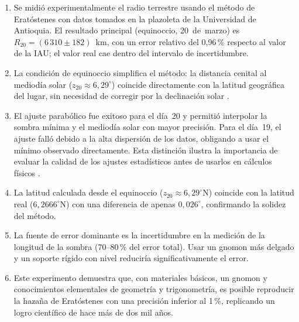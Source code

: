 \begin{enumerate}
  \item Se midió experimentalmente el radio terrestre usando el método
        de Eratóstenes con datos tomados en la plazoleta de la
        Universidad de Antioquia.
        El resultado principal (equinoccio, 20~de~marzo) es
        $R_{20} = (6\,310 \pm 182)$~km, con un error relativo del
        0{,}96\,\% respecto al valor de la IAU; el valor real cae
        dentro del intervalo de incertidumbre.

  \item La condición de equinoccio simplifica el método: la distancia
        cenital al mediodía solar ($z_{20} \approx 6{,}29^\circ$) coincide
        directamente con la latitud geográfica del lugar, sin necesidad
        de corregir por la declinación solar \citep{PortillaBarbosa2009}.

  \item El ajuste parabólico fue exitoso para el día~20 y permitió
        interpolar la sombra mínima y el mediodía solar con mayor
        precisión.
        Para el día~19, el ajuste falló debido a la alta dispersión de
        los datos, obligando a usar el mínimo observado directamente.
        Esta distinción ilustra la importancia de evaluar la calidad
        de los ajustes estadísticos antes de usarlos en cálculos físicos
        \citep{Baird1991}.

  \item La latitud calculada desde el equinoccio
        ($z_{20} \approx 6{,}29^\circ$N) coincide con la latitud real
        ($6{,}2666^\circ$N) con una diferencia de apenas $0{,}026^\circ$,
        confirmando la solidez del método.

  \item La fuente de error dominante es la incertidumbre en la
        medición de la longitud de la sombra (70--80\,\% del
        error total).
        Usar un gnomon más delgado y un soporte rígido con nivel
        reduciría significativamente el error.

  \item Este experimento demuestra que, con materiales básicos, un
        gnomon y conocimientos elementales de geometría y trigonometría,
        es posible reproducir la hazaña de Eratóstenes con una
        precisión inferior al 1\,\%, replicando un logro científico
        de hace más de dos mil años.
\end{enumerate}

